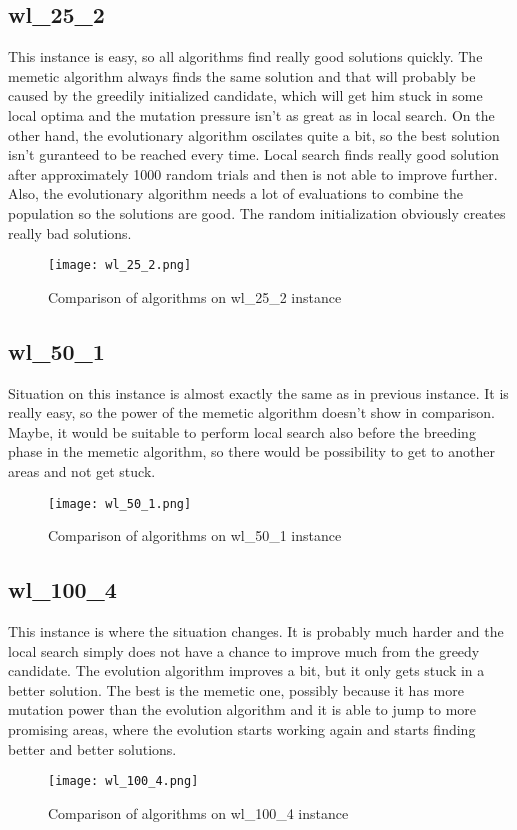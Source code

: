 \documentclass[./main.tex]{subfiles}
\begin{document}
\newpage
\subsection{wl\_25\_2}
This instance is easy, so all algorithms find really good solutions quickly.
The memetic algorithm always finds the same solution and that will probably be caused by the greedily initialized candidate, which will get him stuck in some local optima and the mutation pressure isn't as great as in local search.
On the other hand, the evolutionary algorithm oscilates quite a bit, so the best solution isn't guranteed to be reached every time.
Local search finds really good solution after approximately 1000 random trials and then is not able to improve further.
Also, the evolutionary algorithm needs a lot of evaluations to combine the population so the solutions are good. The random initialization obviously creates really bad solutions.
\begin{figure}[ht]
    \centering
    \texttt{[image: wl\_25\_2.png]}
    \caption{Comparison of algorithms on wl\_25\_2 instance}
\end{figure}

\newpage
\subsection{wl\_50\_1}
Situation on this instance is almost exactly the same as in previous instance.
It is really easy, so the power of the memetic algorithm doesn't show in comparison.
Maybe, it would be suitable to perform local search also before the breeding phase in the memetic algorithm, so there would be possibility to get to another areas and not get stuck.
\begin{figure}[ht]
    \centering
    \texttt{[image: wl\_50\_1.png]}
    \caption{Comparison of algorithms on wl\_50\_1 instance}
\end{figure}

\newpage
\subsection{wl\_100\_4}
This instance is where the situation changes.
It is probably much harder and the local search simply does not have a chance to improve much from the greedy candidate.
The evolution algorithm improves a bit, but it only gets stuck in a better solution.
The best is the memetic one, possibly because it has more mutation power than the evolution algorithm and it is able to jump to more promising areas, where the evolution starts working again and starts finding better and better solutions.
\begin{figure}[ht]
    \centering
    \texttt{[image: wl\_100\_4.png]}
    \caption{Comparison of algorithms on wl\_100\_4 instance}
\end{figure}
\end{document}
